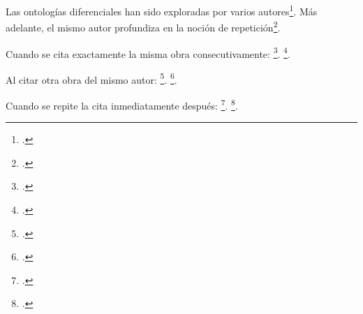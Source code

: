 \documentclass{article}
\begin{document}
	Las ontologías diferenciales han sido exploradas por varios autores\footcite[15]{deleuze2002}.
	Más adelante, el mismo autor profundiza en la noción de repetición\footcite[Véase especialmente el capítulo 2][]{deleuze2002}.

	Cuando se cita exactamente la misma obra consecutivamente:
	\footcite[18]{deleuze2002}.
	\footcite[22]{deleuze2002}. %

	Al citar otra obra del mismo autor:
	\footcite[45]{deleuze1996}.
	\footcite[30]{deleuze2002}. %

	Cuando se repite la cita inmediatamente después:
	\footcite[101]{heidegger1988}.
	\footcite[103]{heidegger1988}. %
\end{document}
